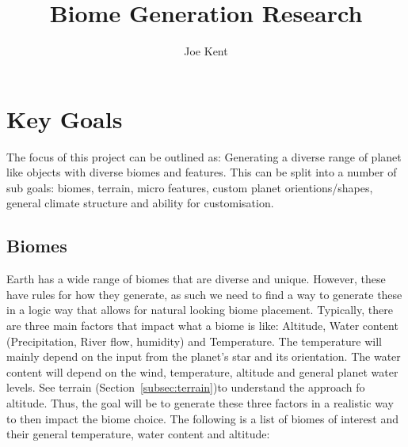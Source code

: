 \documentclass[11pt]{article}
\title{Biome Generation Research}
\author{Joe Kent}
\begin{document}
    \maketitle

    \tableofcontents

    \section{Key Goals}\label{sec:key-goals}
    The focus of this project can be outlined as: Generating a diverse range of planet like objects with diverse biomes and features.
    This can be split into a number of sub goals: biomes, terrain, micro features, custom planet orientions/shapes, general climate structure and ability for customisation.
    \subsection{Biomes}\label{subsec:biomes}
    Earth has a wide range of biomes that are diverse and unique.
    However, these have rules for how they generate, as such we need to find a way to generate these in a logic way that allows for natural looking biome placement.
    Typically, there are three main factors that impact what a biome is like: Altitude, Water content (Precipitation, River flow, humidity) and Temperature.
    The temperature will mainly depend on the input from the planet's star and its orientation.
    The water content will depend on the wind, temperature, altitude and general planet water levels.
    See terrain (Section~\ref{subsec:terrain})to understand the approach fo altitude.
    Thus, the goal will be to generate these three factors in a realistic way to then impact the biome choice.
    The following is a list of biomes of interest and their general temperature, water content and altitude:
\end{document}
